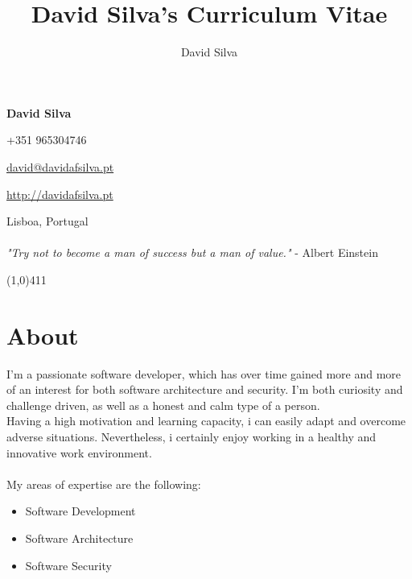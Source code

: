 \documentclass[10pt]{article}
\title{David Silva's Curriculum Vitae}
\author{David Silva}
\newenvironment{listing}{
 \begin{itemize}
  \setlength{\itemsep}{1pt}
  \setlength{\parskip}{0pt}
  \setlength{\parsep}{0pt}
}{\end{itemize}}
\begin{document}
\pagestyle{fancy}

\begin{minipage}[ht]{0.46\textwidth}
	\vspace{-5mm}\Huge{\textbf{David Silva}}
\end{minipage}
\begin{minipage}[ht]{0.46\textwidth}
\hfill +351 965304746

\hfill \href{mailto:david@davidafsilva.pt}{david@davidafsilva.pt}

\hfill \url{http://davidafsilva.pt}
\end{minipage}

\begin{minipage}[ht]{0.925\textwidth}
\vspace{-3mm} Lisboa, Portugal\\\\
\vspace{0 mm} \hfill\footnotesize{
    \textit{"Try not to become a man of success but a man of value."} - Albert Einstein
}
\vspace{0.5mm}
\end{minipage}

\line(1,0){411}
\vspace{2em}

\section*{About}
I'm a passionate software developer, which has over time gained more and more of an interest for both software architecture and security.
I'm both curiosity and challenge driven, as well as a honest and calm type of a person.\\
Having a high motivation and learning capacity, i can easily adapt and overcome adverse situations. Nevertheless, i certainly enjoy working in a healthy and innovative work environment.\\\\
My areas of expertise are the following:
\begin{listing}
	\item Software Development
	\item Software Architecture
	\item Software Security
\end{listing}
\end{document}

